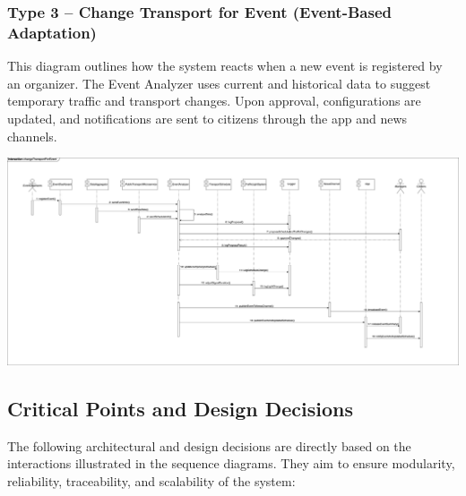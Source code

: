 \newpage
\vspace{1em}
\subsubsection*{Type 3 – Change Transport for Event (Event-Based Adaptation)}

This diagram outlines how the system reacts when a new event is registered by an organizer. The Event Analyzer uses current and historical data to suggest temporary traffic and transport changes. Upon approval, configurations are updated, and notifications are sent to citizens through the app and news channels.

\begin{center}
    \includegraphics[width=1\textwidth]{Images/t3.sequence.png}
\end{center}




\newpage
\subsection{Critical Points and Design Decisions}

The following architectural and design decisions are directly based on the interactions illustrated in the sequence diagrams. They aim to ensure modularity, reliability, traceability, and scalability of the system:

